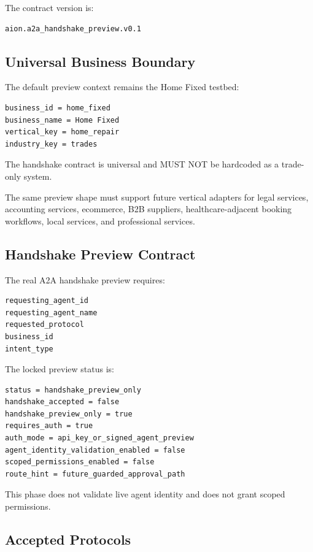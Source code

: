 The contract version is:

\begin{verbatim}
aion.a2a_handshake_preview.v0.1
\end{verbatim}

\subsection{Universal Business Boundary}

The default preview context remains the Home Fixed testbed:

\begin{verbatim}
business_id = home_fixed
business_name = Home Fixed
vertical_key = home_repair
industry_key = trades
\end{verbatim}

The handshake contract is universal and MUST NOT be hardcoded as a trade-only system.

The same preview shape must support future vertical adapters for legal services, accounting services, ecommerce, B2B suppliers, healthcare-adjacent booking workflows, local services, and professional services.

\subsection{Handshake Preview Contract}

The real A2A handshake preview requires:

\begin{verbatim}
requesting_agent_id
requesting_agent_name
requested_protocol
business_id
intent_type
\end{verbatim}

The locked preview status is:

\begin{verbatim}
status = handshake_preview_only
handshake_accepted = false
handshake_preview_only = true
requires_auth = true
auth_mode = api_key_or_signed_agent_preview
agent_identity_validation_enabled = false
scoped_permissions_enabled = false
route_hint = future_guarded_approval_path
\end{verbatim}

This phase does not validate live agent identity and does not grant scoped permissions.

\subsection{Accepted Protocols}

